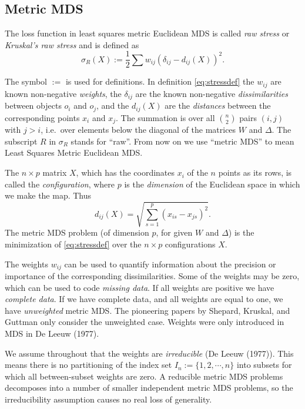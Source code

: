 \documentclass[
  12pt,
]{article}
\begin{document}
\subsection{Metric MDS}\label{metric-mds}

The loss function in least squares
metric Euclidean MDS is called \emph{raw stress} or \emph{Kruskal's raw stress}
and is defined as
\begin{equation}
\sigma_R(X):=\frac12\sum w_{ij}(\delta_{ij}-d_{ij}(X))^2.
\label{eq:stressdef}
\end{equation}

The symbol \(:=\) is used for definitions. In definition
\eqref{eq:stressdef} the \(w_{ij}\) are known non-negative \emph{weights}, the
\(\delta_{ij}\) are the known non-negative \emph{dissimilarities} between
objects \(o_i\) and \(o_j\), and the \(d_{ij}(X)\) are the \emph{distances} between
the corresponding points \(x_i\) and \(x_j\). The summation is over all
\(\binom{n}{2}\) pairs \((i,j)\) with \(j>i\), i.e.~over elements below the
diagonal of the matrices \(W\) and \(\Delta\). The subscript \(R\) in \(\sigma_R\)
stands for ``raw''. From now on we use ``metric
MDS'' to mean Least Squares Metric Euclidean MDS.

The \(n\times p\) matrix \(X\), which has the coordinates \(x_i\) of the \(n\)
points as its rows, is called the \emph{configuration}, where \(p\) is the
\emph{dimension} of the Euclidean space in which we make the map. Thus
\begin{equation}
d_{ij}(X)=\sqrt{\sum_{s=1}^p(x_{is}-x_{js})^2}.
\label{eq:ddef}
\end{equation} The metric MDS problem (of dimension \(p\), for given \(W\)
and \(\Delta\)) is the minimization of \eqref{eq:stressdef} over the
\(n\times p\) configurations \(X\).

The weights \(w_{ij}\) can be used to quantify information about the
precision or importance of the corresponding dissimilarities. Some of
the weights may be zero, which can be used to code \emph{missing data}. If
all weights are positive we have \emph{complete data}. If we have complete
data, and all weights are equal to one, we have \emph{unweighted} metric MDS.
The pioneering papers by Shepard, Kruskal, and Guttman only consider the unweighted case. Weights were only introduced in MDS in De Leeuw (1977).

We assume throughout that the weights are \emph{irreducible} (De Leeuw (1977)).
This means there is no partitioning of the index set
\(I_n:=\{1,2,\cdots,n\}\) into subsets for which all between-subset
weights are zero. A reducible metric MDS problems decomposes into a
number of smaller independent metric MDS problems, so the irreducibility
assumption causes no real loss of generality.
\end{document}
